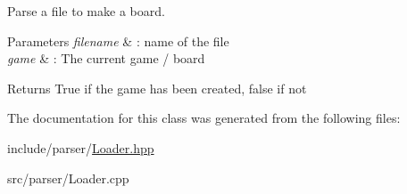 Parse a file to make a board. 


\begin{DoxyParams}{Parameters}
{\em filename} & \+: name of the file \\
\hline
{\em game} & \+: The current game / board \\
\hline
\end{DoxyParams}
\begin{DoxyReturn}{Returns}
True if the game has been created, false if not 
\end{DoxyReturn}


The documentation for this class was generated from the following files\+:\begin{DoxyCompactItemize}
\item 
include/parser/\hyperlink{Loader_8hpp}{Loader.\+hpp}\item 
src/parser/Loader.\+cpp\end{DoxyCompactItemize}

